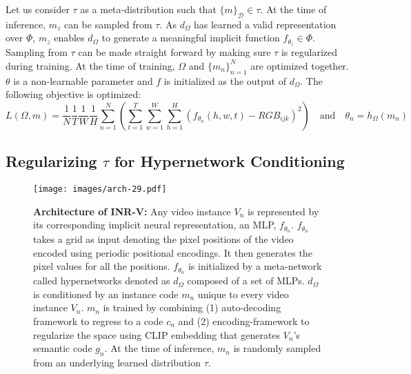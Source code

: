 \documentclass[10pt]{article} \usepackage[accepted]{tmlr}
\begin{document}
Let us consider $\tau$ as a meta-distribution such that $\{m\}_{\mathcal{D}} \in \tau$. At the time of inference, $m_z$ can be sampled from $\tau$. As $d_\Omega$ has learned a valid representation over $\Phi$, $m_z$ enables $d_\Omega$ to generate a meaningful implicit function $f_{\theta_z} \in \Phi$. Sampling from $\tau$ can be made straight forward by making sure $\tau$ is regularized during training. 
At the time of training, $\Omega$ and $\{m_n\}_{n=1}^{N}$ are optimized together. 
$\theta$ is a non-learnable parameter and $f$ is initialized as the output of $d_\Omega$. 
The following objective is optimized:
\begin{equation}
    L(\Omega, m) = \frac{1}{N}\frac{1}{T}\frac{1}{W}\frac{1}{H}\sum_{n=1}^{N}\left(\sum_{t=1}^{T}\sum_{w=1}^{W}\sum_{h=1}^{H} (f_{\theta_n}(h, w, t) - RGB_{ijk})^2\right)
    \label{eq:main_equation} \quad \textrm{and} \quad
    \theta_n = h_\Omega(m_n)
\end{equation}

\subsection{Regularizing $\tau$ for Hypernetwork Conditioning}
\begin{figure}
  \centering
  \texttt{[image: images/arch-29.pdf]}
  \caption{\textbf{Architecture of INR-V: }Any video instance $V_n$ is represented by its corresponding implicit neural representation, an MLP, $f_{\theta_n}$. $f_{\theta_n}$ takes a grid as input denoting the pixel positions of the video encoded using periodic positional encodings. It then generates the pixel values for all the positions. $f_{\theta_n}$ is initialized by a meta-network called hypernetworks denoted as $d_\Omega$ composed of a set of MLPs. $d_\Omega$ is conditioned by an instance code $m_n$ unique to every video instance $V_n$. $m_n$ is trained by combining (1) auto-decoding framework to regress to a code $c_n$ and (2) encoding-framework to regularize the space using CLIP embedding that generates  $V_n$'s semantic code $g_n$. At the time of inference, $m_n$ is randomly sampled from an underlying learned distribution $\tau$.}
  \label{fig:arch}
\end{figure}
\end{document}
